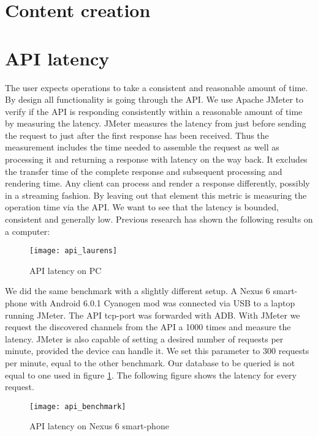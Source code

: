 \section{Content creation}


\section{API latency}
The user expects operations to take a consistent and reasonable amount of time.
By design all functionality is going through the API.
We use Apache JMeter to verify if the API is responding consistently within a reasonable amount of time by measuring the latency.
JMeter measures the latency from just before sending the request to just after the first response has been received. \cite{jmeter_glossary}
Thus the measurement includes the time needed to assemble the request as well as processing it and returning a response with latency on the way back.
It excludes the transfer time of the complete response and subsequent processing and rendering time.
Any client can process and render a response differently, possibly in a streaming fashion.
By leaving out that element this metric is measuring the operation time via the API.
We want to see that the latency is bounded, consistent and generally low.
Previous research has shown the following results on a computer:
\begin{figure}[H]
	\centering %
	\texttt{[image: api\_laurens]}
	\caption{API latency on PC}
	\label{fig:api_laurens}
\end{figure}
We did the same benchmark with a slightly different setup.
A Nexus 6 smart-phone with Android 6.0.1 Cyanogen mod was connected via USB to a laptop running JMeter.
The API tcp-port was forwarded with ADB.
With JMeter we request the discovered channels from the API a 1000 times and measure the latency.
JMeter is also capable of setting a desired number of requests per minute, provided the device can handle it.
We set this parameter to 300 requests per minute, equal to the other benchmark.
Our database to be queried is not equal to one used in figure \ref{fig:api_laurens}.
The following figure shows the latency for every request.
\begin{figure}[H]
	\centering
	\texttt{[image: api\_benchmark]}
	\caption{API latency on Nexus 6 smart-phone}
	\label{fig:api_benchmark}
\end{figure}
